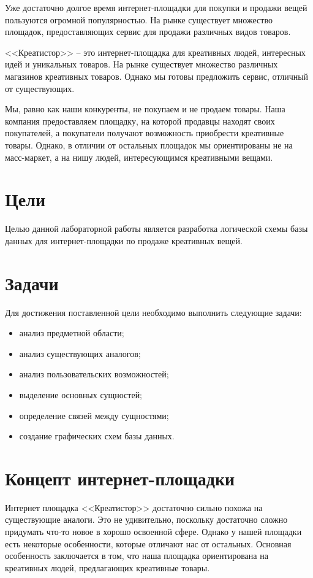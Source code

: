\documentclass[a4paper,14pt]{extarticle}
\begin{document}
Уже достаточно долгое время интернет-площадки для покупки и продажи вещей пользуются огромной популярностью. На рынке существует множество площадок, предоставляющих сервис для продажи различных видов товаров.

<<Креатистор>> -- это интернет-площадка для креативных людей, интересных идей и уникальных товаров. На рынке существует множество различных магазинов креативных товаров. Однако мы готовы предложить сервис, отличный от существующих.

Мы, равно как наши конкуренты, не покупаем и не продаем товары. Наша компания предоставляем площадку, на которой продавцы находят своих покупателей, а покупатели получают возможность приобрести креативные товары. Однако, в отличии от остальных площадок мы ориентированы не на масс-маркет, а на нишу людей, интересующимся креативными вещами.

\section{Цели}

Целью данной лабораторной работы является разработка логической схемы базы данных для интернет-площадки по продаже креативных вещей.

\section{Задачи}

Для достижения поставленной цели необходимо выполнить следующие задачи:
\begin{itemize}
    \item анализ предметной области;
    \item анализ существующих аналогов;
    \item анализ пользовательских возможностей;
    \item выделение основных сущностей;
    \item определение связей между сущностями;
    \item создание графических схем базы данных.
\end{itemize}

\section{Концепт интернет-площадки}

Интернет площадка <<Креатистор>> достаточно сильно похожа на существующие аналоги. Это не удивительно, поскольку достаточно сложно придумать что-то новое в хорошо освоенной сфере. Однако у нашей площадки есть некоторые особенности, которые отличают нас от остальных. Основная особенность заключается в том, что наша площадка ориентирована на креативных людей, предлагающих креативные товары.
\end{document}
